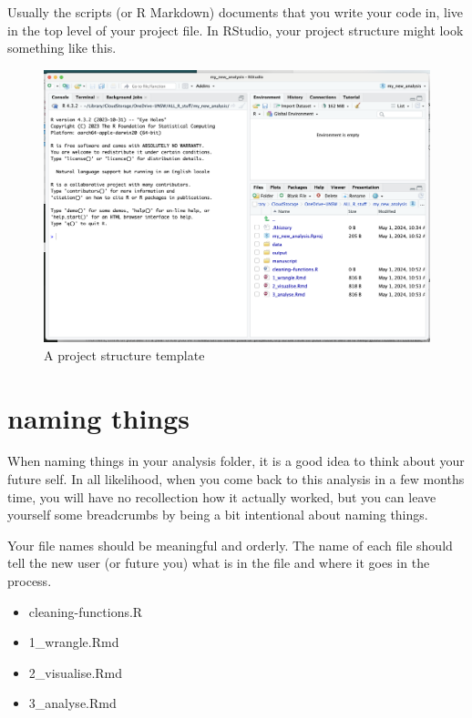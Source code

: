 \documentclass[
  letterpaper,
  DIV=11,
  numbers=noendperiod]{scrreprt}
\providecommand{\tightlist}{%
  \setlength{\itemsep}{0pt}\setlength{\parskip}{0pt}}\usepackage{longtable,booktabs,array}
\begin{document}
Usually the scripts (or R Markdown) documents that you write your code
in, live in the top level of your project file. In RStudio, your project
structure might look something like this.

\begin{figure}[H]

{\centering \includegraphics{images/structure.png}

}

\caption{A project structure template}

\end{figure}%

\section{naming things}\label{naming-things}

When naming things in your analysis folder, it is a good idea to think
about your future self. In all likelihood, when you come back to this
analysis in a few months time, you will have no recollection how it
actually worked, but you can leave yourself some breadcrumbs by being a
bit intentional about naming things.

Your file names should be meaningful and orderly. The name of each file
should tell the new user (or future you) what is in the file and where
it goes in the process.

\begin{itemize}
\tightlist
\item
  cleaning-functions.R
\item
  1\_wrangle.Rmd
\item
  2\_visualise.Rmd
\item
  3\_analyse.Rmd
\end{itemize}
\end{document}

